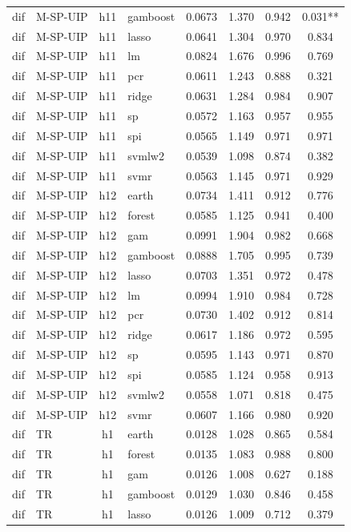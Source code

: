 \begin{ThreePartTable}
\begin{longtable}[t]{llclcccc}
dif & M-SP-UIP & h11 & gamboost & 0.0673 & 1.370 & 0.942 & 0.031**\\
dif & M-SP-UIP & h11 & lasso & 0.0641 & 1.304 & 0.970 & 0.834\\
dif & M-SP-UIP & h11 & lm & 0.0824 & 1.676 & 0.996 & 0.769\\
dif & M-SP-UIP & h11 & pcr & 0.0611 & 1.243 & 0.888 & 0.321\\
dif & M-SP-UIP & h11 & ridge & 0.0631 & 1.284 & 0.984 & 0.907\\
dif & M-SP-UIP & h11 & sp & 0.0572 & 1.163 & 0.957 & 0.955\\
dif & M-SP-UIP & h11 & spi & 0.0565 & 1.149 & 0.971 & 0.971\\
dif & M-SP-UIP & h11 & svmlw2 & 0.0539 & 1.098 & 0.874 & 0.382\\
dif & M-SP-UIP & h11 & svmr & 0.0563 & 1.145 & 0.971 & 0.929\\
\addlinespace
dif & M-SP-UIP & h12 & earth & 0.0734 & 1.411 & 0.912 & 0.776\\
dif & M-SP-UIP & h12 & forest & 0.0585 & 1.125 & 0.941 & 0.400\\
dif & M-SP-UIP & h12 & gam & 0.0991 & 1.904 & 0.982 & 0.668\\
dif & M-SP-UIP & h12 & gamboost & 0.0888 & 1.705 & 0.995 & 0.739\\
dif & M-SP-UIP & h12 & lasso & 0.0703 & 1.351 & 0.972 & 0.478\\
dif & M-SP-UIP & h12 & lm & 0.0994 & 1.910 & 0.984 & 0.728\\
dif & M-SP-UIP & h12 & pcr & 0.0730 & 1.402 & 0.912 & 0.814\\
dif & M-SP-UIP & h12 & ridge & 0.0617 & 1.186 & 0.972 & 0.595\\
dif & M-SP-UIP & h12 & sp & 0.0595 & 1.143 & 0.971 & 0.870\\
dif & M-SP-UIP & h12 & spi & 0.0585 & 1.124 & 0.958 & 0.913\\
dif & M-SP-UIP & h12 & svmlw2 & 0.0558 & 1.071 & 0.818 & 0.475\\
dif & M-SP-UIP & h12 & svmr & 0.0607 & 1.166 & 0.980 & 0.920\\
\addlinespace
dif & TR & h1 & earth & 0.0128 & 1.028 & 0.865 & 0.584\\
dif & TR & h1 & forest & 0.0135 & 1.083 & 0.988 & 0.800\\
dif & TR & h1 & gam & 0.0126 & 1.008 & 0.627 & 0.188\\
dif & TR & h1 & gamboost & 0.0129 & 1.030 & 0.846 & 0.458\\
dif & TR & h1 & lasso & 0.0126 & 1.009 & 0.712 & 0.379\\

\end{longtable}
\end{ThreePartTable}
